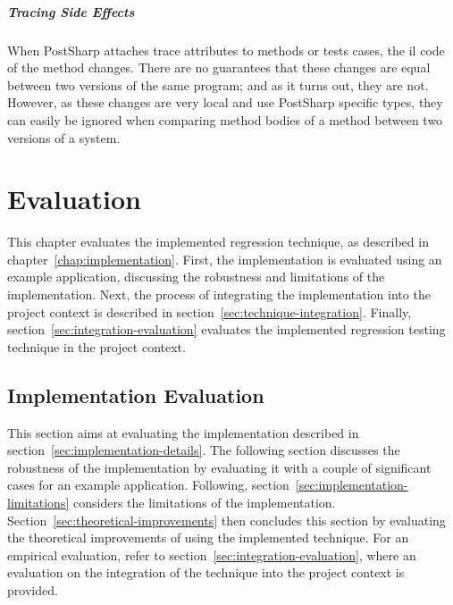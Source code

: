 \documentclass[a4paper,english,12pt]{report}
\let\Chapter\chapter
\def\chapter{\addtocontents{lol}{\protect\addvspace{10pt}}\Chapter}
\begin{document}
\paragraph{Tracing Side Effects}
When PostSharp attaches trace attributes to methods or tests cases, the \gls{il} code of the method changes. There are no guarantees that these changes are equal between two versions of the same program; and as it turns out, they are not. However, as these changes are very local and use PostSharp specific types, they can easily be ignored when comparing method bodies of a method between two versions of a system.

\chapter{Evaluation}\label{chap:evaluation}
This chapter evaluates the implemented regression technique, as described in chapter~\ref{chap:implementation}. First, the implementation is evaluated using an example application, discussing the robustness and limitations of the implementation. Next, the process of integrating the implementation into the project context is described in section~\ref{sec:technique-integration}. Finally, section~\ref{sec:integration-evaluation} evaluates the implemented regression testing technique in the project context.

\section{Implementation Evaluation}\label{sec:implementation-evaluation}
This section aims at evaluating the implementation described in section~\ref{sec:implementation-details}. The following section discusses the robustness of the implementation by evaluating it with a couple of significant cases for an example application. Following, section~\ref{sec:implementation-limitations} considers the limitations of the implementation. Section~\ref{sec:theoretical-improvements} then concludes this section by evaluating the theoretical improvements of using the implemented technique. For an empirical evaluation, refer to section~\vref{sec:integration-evaluation}, where an evaluation on the integration of the technique into the project context is provided.
\end{document}
